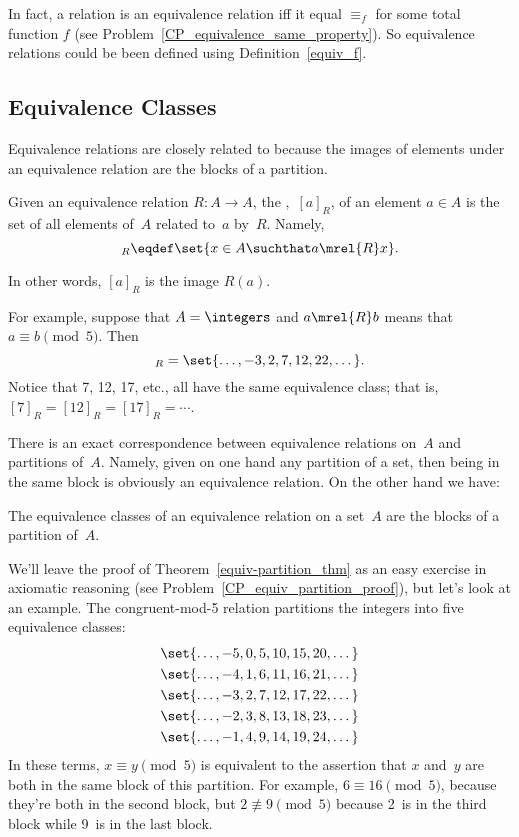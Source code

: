 In fact, a relation is an equivalence relation iff it equal $\equiv_f$
for some total function $f$ (see
Problem~\ref{CP_equivalence_same_property}).  So equivalence relations
could be been defined using Definition~\ref{equiv_f}.

\subsection{Equivalence Classes}

Equivalence relations are closely related to  because
the images of elements under an equivalence relation are the blocks of
a partition.

\begin{definition}\label{def:equiv_class}
Given an equivalence relation $R : A \to A$, the ,~$[a]_R$, of an element $a \in A$  is the set of all elements of~$A$
related to~$a$ by~$R$.  Namely,
\begin{equation*}
    [a]_R \eqdef \set{x \in A \suchthat a \mrel{R} x}.
\end{equation*}
\end{definition}
In other words, $[a]_R$ is the image $R(a)$.

For example, suppose that $A = \integers$ and $a \mrel{R} b$ means
that $a \equiv b \pmod{5}$.  Then
\begin{equation*}
    [7]_R = \set{\dots, -3, 2, 7, 12, 22, \dots}.
\end{equation*}
Notice that 7, 12, 17, etc., all have the same equivalence class; that
is, $[7]_R = [12]_R = [17]_R = \cdots$.

There is an exact correspondence between equivalence relations on~$A$
and partitions of~$A$.  Namely, given on one hand any partition of a
set, then being in the same block is obviously an equivalence
relation.  On the other hand we have:
\begin{theorem}\label{equiv-partition_thm}
The equivalence classes of an equivalence relation on a set~$A$ are
the blocks of a partition of~$A$.
\end{theorem}

We'll leave the proof of Theorem~\ref{equiv-partition_thm} as an easy
exercise in axiomatic reasoning (see
Problem~\ref{CP_equiv_partition_proof}), but let's look at an example.
The congruent-mod-5 relation partitions the integers into five
equivalence classes:
\begin{gather*}
    \set{ \dots, -5, 0, 5, 10, 15, 20, \dots } \\
    \set{ \dots, -4, 1, 6, 11, 16, 21, \dots } \\
    \set{ \dots, -3, 2, 7, 12, 17, 22, \dots } \\
    \set{ \dots, -2, 3, 8, 13, 18, 23, \dots } \\
    \set{ \dots, -1, 4, 9, 14, 19, 24, \dots }
\end{gather*}
In these terms, $x \equiv y \pmod{5}$ is equivalent to the assertion
that $x$ and~$y$ are both in the same block of this partition.  For
example, $6 \equiv 16 \pmod{5}$, because they're both in the second
block, but $2 \not\equiv 9 \pmod{5}$ because 2~is in the third block
while 9~is in the last block.

